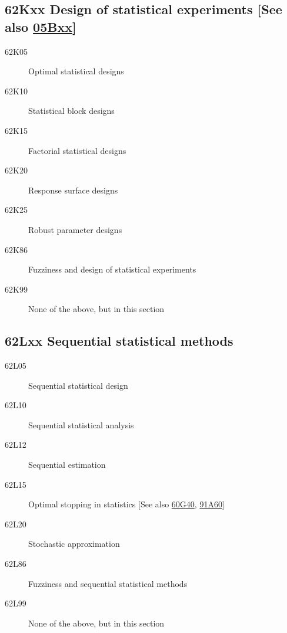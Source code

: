\subsection*{62Kxx  Design of statistical experiments [See also \hyperref[05Bxx]{05Bxx}] }\label{62Kxx}
\begin{description}  
\item [62K05]\label{62K05} Optimal statistical designs
\item [62K10]\label{62K10} Statistical block designs
\item [62K15]\label{62K15} Factorial statistical designs
\item [62K20]\label{62K20} Response surface designs
\item [62K25]\label{62K25} Robust parameter designs
\item [62K86]\label{62K86} Fuzziness and design of statistical experiments
\item [62K99]\label{62K99} None of the above, but in this section
\end{description}
\subsection*{62Lxx  Sequential statistical methods }\label{62Lxx}
\begin{description}  
\item [62L05]\label{62L05} Sequential statistical design
\item [62L10]\label{62L10} Sequential statistical analysis
\item [62L12]\label{62L12} Sequential estimation
\item [62L15]\label{62L15} Optimal stopping in statistics [See also \hyperref[60G40]{60G40}, \hyperref[91A60]{91A60}]
\item [62L20]\label{62L20} Stochastic approximation
\item [62L86]\label{62L86} Fuzziness and sequential statistical methods
\item [62L99]\label{62L99} None of the above, but in this section
\end{description}
